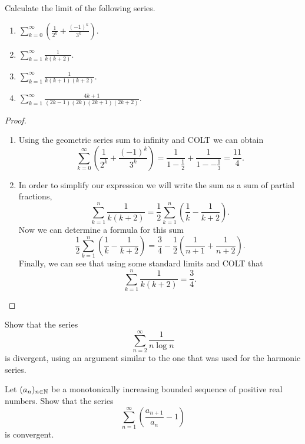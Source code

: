 \documentclass[10pt, a4paper]{article}
\newcommand{\infsum}[1][n = 1]{\sum_{#1}^{\infty}}
\newcommand{\seq}[2][x]{(#1_{#2})_{#2 \in \N}}
\begin{document}
\begin{example}
    Calculate the limit of the following series.
    \begin{enumerate}[label = \alph*.]
        \item $\displaystyle \infsum[k = 0] \left(\frac{1}{2 ^ k} + \frac{(-1) ^ k}{3 ^ k}\right).$
        \item $\displaystyle \infsum[k = 1] \frac{1}{k(k + 2)}.$
        \item $\displaystyle \infsum[k = 1] \frac{1}{k(k + 1)(k + 2)}.$
        \item $\displaystyle \infsum[k = 1] \frac{4k + 1}{(2k - 1)(2k)(2k + 1)(2k + 2)}.$
    \end{enumerate}
    \begin{proof}
        \begin{enumerate}[label = \alph*.]
        \item 
        Using the geometric series sum to infinity and COLT we can obtain 
        \[
        \infsum[k = 0] \left(\frac{1}{2 ^ k} + \frac{(-1) ^ k}{3 ^ k}\right) = \frac{1}{1 - \frac{1}{2}} + \frac{1}{1 -- \frac{1}{3}} = \frac{11}{4}.
        \]
        \item
        In order to simplify our expression we will write the sum as a sum of partial fractions,
        \[
        \sum_{k = 1}^{n} \frac{1}{k(k + 2)} = \frac{1}{2}\sum_{k = 1}^{n} \left(\frac{1}{k} - \frac{1}{k + 2}\right).
        \]
        Now we can determine a formula for this sum
        \[
        \frac{1}{2}\sum_{k = 1}^{n} \left(\frac{1}{k} - \frac{1}{k + 2}\right) = \frac{3}{4} - \frac{1}{2}\left(\frac{1}{n + 1} + \frac{1}{n + 2}\right).
        \]
        Finally, we can see that using some standard limits and COLT that
        \[
        \sum_{k = 1}^{n} \frac{1}{k(k + 2)} = \frac{3}{4}.
        \]
    \end{enumerate}
    \end{proof}
\end{example}

\begin{example}
    Show that the series
    \[
    \sum_{n = 2}^{\infty}\frac{1}{n\log n}
    \]
    is divergent, using an argument similar to the one that was used for the harmonic series.
\end{example}

\begin{example}
    Let $\seq[a]{n}$ be a monotonically increasing bounded sequence of positive real numbers. Show that the series
    \[
    \sum_{n = 1}^{\infty}\left(\frac{a_{n + 1}}{a_n} - 1\right)
    \]
    is convergent.
\end{example}
\end{document}
